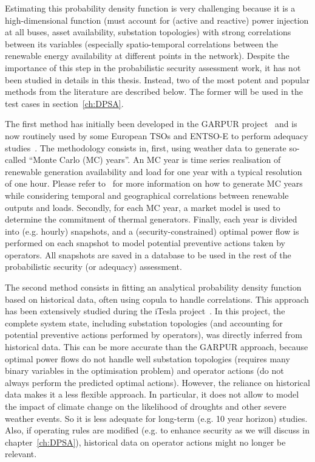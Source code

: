Estimating this probability density function is very challenging because it is a high-dimensional function (must account for (active and reactive) power injection at all buses, asset availability, substation topologies) with strong correlations between its variables (especially spatio-temporal correlations between the renewable energy availability at different points in the network). Despite the importance of this step in the probabilistic security assessment work, it has not been studied in details in this thesis. Instead, two of the most potent and popular methods from the literature are described below. The former will be used in the test cases in section~\ref{ch:DPSA}.

The first method has initially been developed in the GARPUR project~\cite{StrathElia, StrathGARPUR} and is now routinely used by some European TSOs and ENTSO-E to perform adequacy studies~\cite{ACER_MC_year, EliaAdequacy}. The methodology consists in, first, using weather data to generate so-called ``Monte Carlo (MC) years''. An MC year is time series realisation of renewable generation availability and load for one year with a typical resolution of one hour. Please refer to~\cite{StrathGARPUR} for more information on how to generate MC years while considering temporal and geographical correlations between renewable outputs and loads. Secondly, for each MC year, a market model is used to determine the commitment of thermal generators. Finally, each year is divided into (e.g. hourly) snapshots, and a (security-constrained) optimal power flow is performed on each snapshot to model potential preventive actions taken by operators. All snapshots are saved in a database to be used in the rest of the probabilistic security (or adequacy) assessment. %

The second method consists in fitting an analytical probability density function based on historical data, often using copula to handle correlations. This approach has been extensively studied during the iTesla project~\cite{KonstantelosCopulas, EurostagHPC}. In this project, the complete system state, including substation topologies (and accounting for potential preventive actions performed by operators), was directly inferred from historical data. This can be more accurate than the GARPUR approach, because optimal power flows do not handle well substation topologies (requires many binary variables in the optimisation problem) and operator actions (do not always perform the predicted optimal actions). However, the reliance on historical data makes it a less flexible approach. In particular, it does not allow to model the impact of climate change on the likelihood of droughts and other severe weather events. So it is less adequate for long-term (e.g. 10 year horizon) studies. Also, if operating rules are modified (e.g. to enhance security as we will discuss in chapter~\ref{ch:DPSA}), historical data on operator actions might no longer be relevant.


